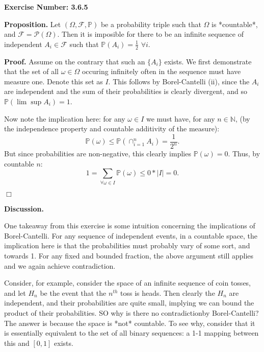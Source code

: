 \documentclass{article}
\begin{document}
\noindent \textbf{Exercise Number: 3.6.5}  %

\medskip 

\noindent \textbf{Proposition.} Let $(\Omega, \mathcal{F}, \mathbb{P})$ be a probability triple such that $\Omega$ is *countable*, and $\mathcal{F} = \mathcal{P}(\Omega)$. Then it is imposible for there to be an infinite sequence of independent $A_i \in \mathcal{F}$ such that $\mathbb{P}(A_i) = \frac{1}{2}$ $\forall i$. 

\bigskip

\noindent \textbf{Proof.} Assume on the contrary that such an $\{A_i\}$ exists. We first demonstrate that the set of all $\omega \in \Omega$ occuring infinitely often in the sequence must have measure one. Denote this set as $I$. This follows by Borel-Cantelli (ii), since the $A_i$ are independent and the sum of their probabilities is clearly divergent, and so $\mathbb{P}(\lim \sup A_i) = 1$.

Now note the implication here: for any $\omega \in I$ we must have, for any $n \in \mathbb{N}$, (by the independence property and countable additivity of the measure): \[\mathbb{P}(\omega) \leq \mathbb{P}(\cap_{i=1}^n A_i) = \frac{1}{2^n}.\] But since probabilities are non-negative, this clearly implies $\mathbb{P}(\omega) = 0$. Thus, by countable $n$: \[1 = \sum_{\forall \omega \in I} \mathbb{P}(\omega) \leq 0 * |I| = 0.\] 

\hfill $\Box$  

\bigskip

\bigskip

\noindent \textbf{Discussion.}

One takeaway from this exercise is some intuition concerning the implications of Borel-Cantelli. For any sequence of independent events, in a countable space, the implication here is that the probabilities must probably vary of some sort, and towards 1. For any fixed and bounded fraction, the above argument still applies and we again achieve contradiction.  

Consider, for example, consider the space of an infinite sequence of coin tosses, and let $H_n$ be the event that the $n^{th}$ toss is heads. Then clearly the $H_n$ are independent, and their probabilities are quite small, implying we can bound the product of their probabilities. SO why is there no contradictionby Borel-Cantelli? The answer is because the space is *not* countable. To see why, consider that it is essentially equivalent to the set of all binary sequences: a 1-1 mapping between this and $[0,1]$ exists. 
 
\end{document}
